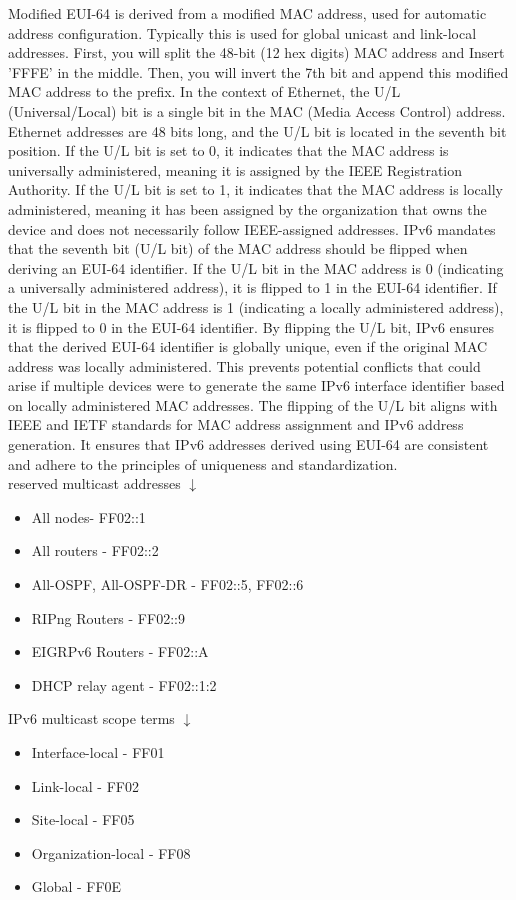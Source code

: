 \documentclass{article}
\begin{document}
	  Modified EUI-64 is derived from a modified MAC address, used for automatic address configuration. Typically this is used for global unicast and link-local addresses. First, you will split the 48-bit (12 hex digits) MAC address and Insert 'FFFE' in the middle. Then, you will invert the 7th bit and append this modified MAC address to the prefix. In the context of Ethernet, the U/L (Universal/Local) bit is a single bit in the MAC (Media Access Control) address. Ethernet addresses are 48 bits long, and the U/L bit is located in the seventh bit position. If the U/L bit is set to 0, it indicates that the MAC address is universally administered, meaning it is assigned by the IEEE Registration Authority. If the U/L bit is set to 1, it indicates that the MAC address is locally administered, meaning it has been assigned by the organization that owns the device and does not necessarily follow IEEE-assigned addresses. IPv6 mandates that the seventh bit (U/L bit) of the MAC address should be flipped when deriving an EUI-64 identifier. If the U/L bit in the MAC address is 0 (indicating a universally administered address), it is flipped to 1 in the EUI-64 identifier. If the U/L bit in the MAC address is 1 (indicating a locally administered address), it is flipped to 0 in the EUI-64 identifier. By flipping the U/L bit, IPv6 ensures that the derived EUI-64 identifier is globally unique, even if the original MAC address was locally administered. This prevents potential conflicts that could arise if multiple devices were to generate the same IPv6 interface identifier based on locally administered MAC addresses. The flipping of the U/L bit aligns with IEEE and IETF standards for MAC address assignment and IPv6 address generation. It ensures that IPv6 addresses derived using EUI-64 are consistent and adhere to the principles of uniqueness and standardization.\\

reserved multicast addresses $\downarrow$
\begin{itemize}
\item All nodes- FF02::1
\item All routers - FF02::2
\item All-OSPF, All-OSPF-DR - FF02::5, FF02::6
\item RIPng Routers - FF02::9
\item EIGRPv6 Routers - FF02::A
\item DHCP relay agent - FF02::1:2
\end{itemize}

IPv6 multicast scope terms $\downarrow$
\begin{itemize}
\item Interface-local - FF01
\item Link-local - FF02
\item Site-local - FF05
\item Organization-local - FF08
\item Global - FF0E
\end{itemize}
\end{document}
